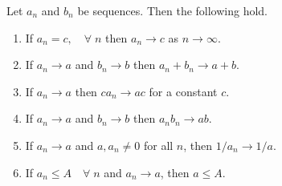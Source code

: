 \begin{lemma}
	\label{prop:manipulating}
	Let $a_n$ and $b_n$ be sequences. Then the following hold.
	\begin{enumerate}[label=(\roman*)]
		\item If $a_n = c, \quad \forall \; n$ then $a_n \to c$ as $n \to \infty$.
		\item If $a_n \rightarrow a$ and $b_n \rightarrow b$ then $a_n + b_n \rightarrow a + b$.
		\item If $a_n \rightarrow a$ then $c a_n \rightarrow ac$ for a constant $c$.
		\item If $a_n \rightarrow a$ and $b_n \rightarrow b$ then $a_n b_n \rightarrow a b$.
		\item If $a_n \rightarrow a$ and $a, a_n \neq 0$ for all $n$, then $1/a_n \rightarrow 1/a$. \label{lem:1.3v}
		\item If $a_n \leq A \quad \forall \; n$ and $a_n \to a$, then $a \leq A$. \label{lem:1.3vi}
	\end{enumerate}
\end{lemma}
